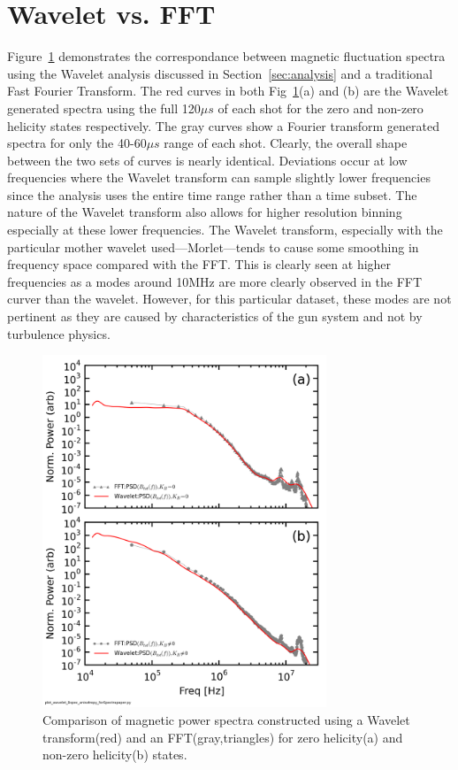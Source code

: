 \documentclass[aip,prl,amsmath,amssymb,reprint,superscriptaddress]{revtex4-1} %
\begin{document}
\section{Wavelet vs. FFT}\label{sec:WaveFFT}

Figure~\ref{fig:WavevsFFT} demonstrates the correspondance between magnetic fluctuation spectra using the Wavelet analysis discussed in Section~\ref{sec:analysis} and a traditional Fast Fourier Transform. The red curves in both Fig~\ref{fig:WavevsFFT}(a) and (b) are the Wavelet generated spectra using the full 120$\mu s$ of each shot for the zero and non-zero helicity states respectively. The gray curves show a Fourier transform generated spectra for only the 40-60$\mu s$ range of each shot. Clearly, the overall shape between the two sets of curves is nearly identical. Deviations occur at low frequencies where the Wavelet transform can sample slightly lower frequencies since the analysis uses the entire time range rather than a time subset. The nature of the Wavelet transform also allows for higher resolution binning especially at these lower frequencies. The Wavelet transform, especially with the particular mother wavelet used---Morlet---tends to cause some smoothing in frequency space compared with the FFT. This is clearly seen at higher frequencies as a modes around 10MHz are more clearly observed in the FFT curver than the wavelet. However, for this particular dataset, these modes are not pertinent as they are caused by characteristics of the gun system and not by turbulence physics.

\begin{figure}[!htbp]
\centerline{
\includegraphics[width=8.5cm]{Bperppara_chan1t4_WaveletvsFFT_40t60us}}
\caption{\label{fig:WavevsFFT} Comparison of magnetic power spectra constructed using a Wavelet transform(red) and an FFT(gray,triangles) for zero helicity(a) and non-zero helicity(b) states.}
\end{figure}
\end{document}
